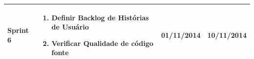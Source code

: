 \begin{table}
\begin{center}
\begin{tabular}{ | p{2cm} | p{8cm} | p{2cm}| p{2cm} |}
    Sprint 6 & \begin{enumerate}
    \item Definir Backlog de Histórias de Usuário
    \item Verificar Qualidade de código fonte
    \end{enumerate} & 01/11/2014 & 10/11/2014\\ \hline
    \end{tabular}    
\end{center}
\label{cronograma}
\end{table}
